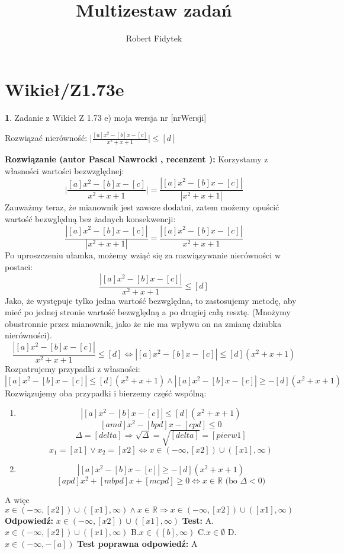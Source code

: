 \documentclass[12pt, a4paper]{article}
\title{Multizestaw zadań}
\author{Robert Fidytek}
\date{}
\theoremstyle{definition} %
\newtheorem{zad}{}
\newcommand{\kategoria}[1]{\section{#1}} %
\newcommand{\zadStart}[1]{\begin{zad}#1\newline} %
\newcommand{\zadStop}{\end{zad}}   %
\newcommand{\rozwStart}[2]{\noindent \textbf{Rozwiązanie (autor #1 , recenzent #2): }\newline} %
\newcommand{\rozwStop}{\newline}                                            %
\newcommand{\odpStart}{\noindent \textbf{Odpowiedź:}\newline}    %
\newcommand{\odpStop}{\newline}                                             %
\newcommand{\testStart}{\noindent \textbf{Test:}\newline} %
\newcommand{\testStop}{\newline} %
\newcommand{\kluczStart}{\noindent \textbf{Test poprawna odpowiedź:}\newline} %
\newcommand{\kluczStop}{\newline} %
\begin{document}
\maketitle


\kategoria{Wikieł/Z1.73e}
\zadStart{Zadanie z Wikieł Z 1.73 e) moja wersja nr [nrWersji]}

Rozwiązać nierówność: $\big|\frac{[a]x^2-[b]x-[c]}{x^2+x+1}\big|\leq[d]$
\zadStop
\rozwStart{Pascal Nawrocki}{}
Korzystamy z własności wartości bezwzględnej:
$$\bigg|\frac{[a]x^2-[b]x-[c]}{x^2+x+1}\bigg|=\frac{|[a]x^2-[b]x-[c]|}{|x^2+x+1|}$$
Zauważmy teraz, że mianownik jest zawsze dodatni, zatem możemy opuścić wartość bezwględną bez żadnych konsekwencji:
$$\frac{|[a]x^2-[b]x-[c]|}{|x^2+x+1|}=\frac{|[a]x^2-[b]x-[c]|}{x^2+x+1}$$
Po uproszczeniu ułamka, możemy wziąć się za rozwiązywanie nierówności w postaci:
$$\frac{|[a]x^2-[b]x-[c]|}{x^2+x+1}\leq[d]$$
Jako, że występuje tylko jedna wartość bezwględna, to zastosujemy metodę, aby mieć po jednej stronie wartość bezwględną a po drugiej całą resztę. (Mnożymy obustronnie przez mianownik, jako że nie ma wpływu on na zmianę dziubka nierówności).
$$\frac{|[a]x^2-[b]x-[c]|}{x^2+x+1}\leq[d]\Leftrightarrow|[a]x^2-[b]x-[c]|\leq[d](x^2+x+1)$$
Rozpatrujemy przypadki z własności:
$$|[a]x^2-[b]x-[c]|\leq[d](x^2+x+1) \wedge |[a]x^2-[b]x-[c]|\geq-[d](x^2+x+1)$$
Rozwiązujemy oba przypadki i bierzemy część wspólną:
\begin{enumerate}
\item$$|[a]x^2-[b]x-[c]|\leq[d](x^2+x+1)$$
$$[amd]x^2-[bpd]x-[cpd]\leq0$$
$$\Delta=[delta]\Rightarrow\sqrt{\Delta}=\sqrt{[delta]}=[pierw1]$$
$$x_1=[x1] \vee x_2=[x2]\Leftrightarrow x\in(-\infty,[x2])\cup([x1],\infty)$$
\item$$|[a]x^2-[b]x-[c]|\geq-[d](x^2+x+1)$$
$$[apd]x^2+[mbpd]x+[mcpd]\geq0\Leftrightarrow x\in\mathbb{R} \text{ (bo $\Delta<0$)}$$
\end{enumerate}
A więc $x\in(-\infty,[x2])\cup([x1],\infty) \wedge x\in\mathbb{R} \Rightarrow  x\in(-\infty,[x2])\cup([x1],\infty)$
\rozwStop
\odpStart
$x\in(-\infty,[x2])\cup([x1],\infty)$
\odpStop
\testStart
A. $x\in(-\infty,[x2])\cup([x1],\infty)$
B.$x\in([b],\infty)$
C.$x\in\emptyset$
D.$x\in(-\infty,-[a])$
\testStop
\kluczStart
A
\kluczStop
\end{document}
